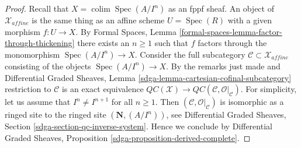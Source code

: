 \documentclass[10pt,a4paper]{amsart}
\theoremstyle{plain}
\theoremstyle{definition}
\theoremstyle{remark}
\numberwithin{equation}{subsection}
\def\colim{\mathop{\mathrm{colim}}\nolimits}
\def\Spec{\mathop{\mathrm{Spec}}}
\begin{document}
\begin{proof}
Recall that $X = \colim \Spec(A/I^n)$ as an fppf sheaf.
An object of $\mathcal{X}_{affine}$ is the same thing
as an affine scheme $U = \Spec(R)$ with a given morphism $f : U \to X$.
By Formal Spaces, Lemma \ref{formal-spaces-lemma-factor-through-thickening}
there exists an $n \geq 1$ such that
$f$ factors through the monomorphism $\Spec(A/I^n) \to X$.
Consider the full subcategory
$\mathcal{C} \subset \mathcal{X}_{affine}$ consisting of
the objects $\Spec(A/I^n) \to X$.
By the remarks just made and Differential Graded Sheaves, Lemma
\ref{sdga-lemma-cartesian-cofinal-subcategory}
restriction to $\mathcal{C}$ is an exact equivalence
$\mathit{QC}(\mathcal{X}) \to
\mathit{QC}(\mathcal{C}, \mathcal{O}|_\mathcal{C})$.
For simplicity, let us assume that
$I^n \not = I^{n + 1}$ for all $n \geq 1$.
Then $(\mathcal{C}, \mathcal{O}|_\mathcal{C})$ is isomorphic 
as a ringed site to the ringed site $(\mathbf{N}, (A/I^n))$, see
Differential Graded Sheaves, Section
\ref{sdga-section-qc-inverse-system}.
Hence we conclude by Differential Graded Sheaves, Proposition
\ref{sdga-proposition-derived-complete}.
\end{proof}
\end{document}
